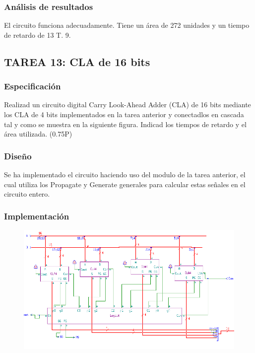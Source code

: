 \documentclass{article}
\begin{document}
		\subsubsection*{Análisis de resultados}
		El circuito funciona adecuadamente. Tiene un área de 272 unidades y un tiempo de retardo de 13 T.
9.

	\subsection{TAREA 13: CLA de 16 bits}
		\subsubsection*{Especificación}
Realizad un circuito digital Carry Look-Ahead Adder (CLA) de 16 bits mediante los
CLA de 4 bits implementados en la tarea anterior y conectadlos en cascada tal y como se muestra en
la siguiente figura. Indicad los tiempos de retardo y el área utilizada. (0.75P)


		\subsubsection*{Diseño}
		Se ha implementado el circuito haciendo uso del modulo de la tarea anterior, el cual utiliza los Propagate y Generate generales para calcular estas señales en el circuito entero.


		\subsubsection*{Implementación}
		 \begin{figure}[ht]
			\includegraphics[width=0.8\linewidth]{CLA16}
		 	\centering
		 \end{figure}
\end{document}
